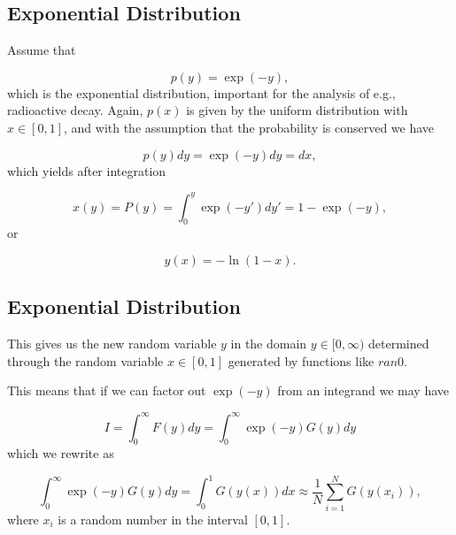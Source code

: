 \documentclass[%
oneside,                 %
final,                   %
10pt]{article}
\newenvironment{block_mdfboxadmon}[1][]{
\begin{block_mdfboxmdframed}[frametitle=#1]
}
{
\end{block_mdfboxmdframed}
}
\begin{document}
\subsection{Exponential Distribution}

\begin{block_mdfboxadmon}[]
Assume that

\begin{equation*}
  p(y)=\exp{(-y)},
\end{equation*}
which is the exponential distribution, important for the analysis
of e.g., radioactive decay. Again, 
$p(x)$ is given by the uniform distribution with 
$x \in [0,1]$, and 
with the assumption that the probability is conserved we have

\begin{equation*}
   p(y)dy=\exp{(-y)}dy=dx,  
\end{equation*}
which yields after integration

\begin{equation*}
   x(y)=P(y)=\int_0^y \exp{(-y')}dy'=1-\exp{(-y)},
\end{equation*}
or

\begin{equation*}
   y(x)=-\ln{(1-x)}.
\end{equation*}
\end{block_mdfboxadmon} %



\subsection{Exponential Distribution}

\begin{block_mdfboxadmon}[]
This gives us the new random variable $y$ in the domain
$y \in [0,\infty)$
determined through the random variable $x \in [0,1]$ generated by
functions like $ran0$. 

This means that if we can factor out 
$\exp{(-y)}$ from an integrand we may have

\begin{equation*}
   I=\int_0^{\infty}F(y)dy=\int_0^{\infty}\exp{(-y)}G(y)dy   
\end{equation*}
which we rewrite as

\begin{equation*}
  \int_0^{\infty}\exp{(-y)}G(y)dy=
   \int_0^{1}G(y(x))dx\approx 
   \frac{1}{N}\sum_{i=1}^NG(y(x_i)),
\end{equation*}
where $x_i$ is a random number in the interval $[0,1]$.
\end{block_mdfboxadmon} %
\end{document}
